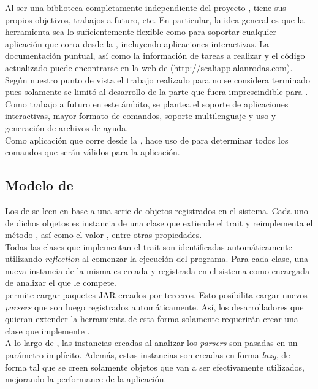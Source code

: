 Al ser una biblioteca completamente independiente del proyecto \fronttier, 
\scaliapp tiene sus propios objetivos, trabajos a futuro, etc. En particular, 
la idea general es que la herramienta sea lo suficientemente flexible como para 
soportar cualquier aplicación que corra desde la \cli, incluyendo aplicaciones 
interactivas. La documentación puntual, así como la información de tareas a 
realizar y el código actualizado puede encontrarse en la web de \scaliapp 
(http://scaliapp.alanrodas.com).\\
Según nuestro punto de vista el trabajo realizado para \scaliapp no se 
considera terminado pues solamente se limitó al desarrollo de la parte que 
fuera imprescindible para \fronttier. Como trabajo a futuro en este ámbito, se 
plantea el soporte de aplicaciones interactivas, mayor formato de comandos, 
soporte multilenguaje y uso y generación de archivos de ayuda.\\
Como aplicación que corre desde la \cli, \fronttier hace uso de \scaliapp para 
determinar todos los comandos que serán válidos para la aplicación.

\subsection{Modelo de \conffiles}

Los \conffiles de \fronttier se leen en base a una serie de objetos registrados 
en el sistema. Cada uno de dichos objetos es instancia de una clase que 
extiende el trait  y reimplementa el método , 
así como el valor , entre otras propiedades.\\
Todas las clases que implementan el trait  son identificadas 
automáticamente utilizando \emph{reflection} al comenzar la ejecución del 
programa. Para cada clase, una nueva instancia de la misma es creada y 
registrada en el sistema como encargada de analizar el \conffile que le 
compete.\\
\fronttier permite cargar paquetes JAR creados por terceros. Esto posibilita 
cargar nuevos \emph{parsers} que son luego registrados automáticamente. Así, 
los desarrolladores que quieran extender la herramienta de esta forma solamente 
requerirán crear una clase que implemente .\\
A lo largo de \fronttier, las instancias creadas al analizar los \emph{parsers} 
son pasadas en un parámetro implícito. Además, estas instancias son creadas en 
forma \emph{lazy}, de forma tal que se creen solamente objetos que van a ser 
efectivamente utilizados, mejorando la performance de la aplicación.

